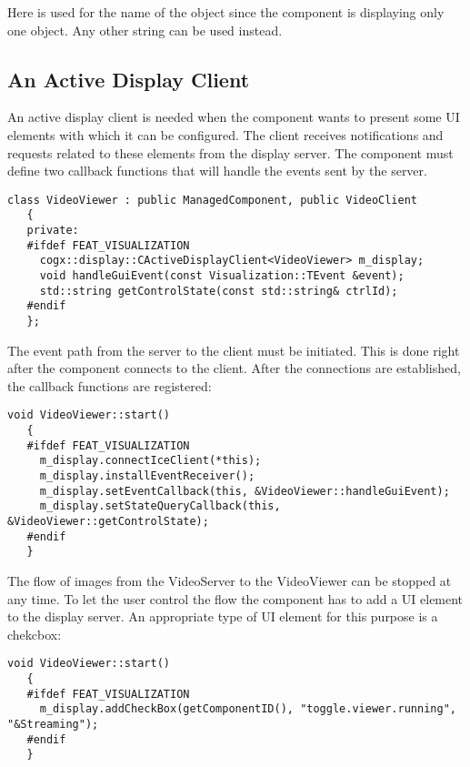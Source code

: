 Here  is used for the name of the object since the component
is displaying only one object. Any other string can be used instead.


\subsection{An Active Display Client}

An active display client is needed when the component wants to present some UI
elements with which it can be configured. The client receives notifications and
requests related to these elements from the display server. The component must
define two callback functions that will handle the events sent by the server.

\begin{Verbatim}[fontsize=\scriptsize,gobble=3]
   class VideoViewer : public ManagedComponent, public VideoClient
   {
   private:
   #ifdef FEAT_VISUALIZATION
     cogx::display::CActiveDisplayClient<VideoViewer> m_display;
     void handleGuiEvent(const Visualization::TEvent &event);
     std::string getControlState(const std::string& ctrlId);
   #endif
   };
\end{Verbatim}

The event path from the server to the client must be initiated. This is done right
after the component connects to the client. After the connections are established,
the callback functions are registered:

\begin{Verbatim}[fontsize=\scriptsize,gobble=3]
   void VideoViewer::start()
   {
   #ifdef FEAT_VISUALIZATION
     m_display.connectIceClient(*this);
     m_display.installEventReceiver();
     m_display.setEventCallback(this, &VideoViewer::handleGuiEvent);
     m_display.setStateQueryCallback(this, &VideoViewer::getControlState);
   #endif
   }
\end{Verbatim}

The flow of images from the VideoServer to the VideoViewer can be stopped at
any time. To let the user control the flow the component has to add a UI
element to the display server.  An appropriate type of UI element for this
purpose is a chekcbox:

\begin{Verbatim}[fontsize=\scriptsize,gobble=3]
   void VideoViewer::start()
   {
   #ifdef FEAT_VISUALIZATION
     m_display.addCheckBox(getComponentID(), "toggle.viewer.running", "&Streaming");
   #endif
   }
\end{Verbatim}

